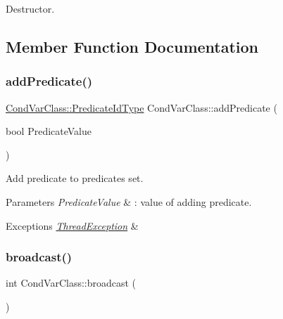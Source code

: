Destructor. 



\subsection{Member Function Documentation}
\mbox{\label{classCondVarClass_a18c457bbb27be21285f9cc52a5b8e877}} 
\subsubsection{\texorpdfstring{add\+Predicate()}{addPredicate()}}
{\footnotesize\ttfamily \hyperlink{classCondVarClass_a8e27f99972b8b95f064d6657a4583a5b}{Cond\+Var\+Class\+::\+Predicate\+Id\+Type} Cond\+Var\+Class\+::add\+Predicate (\begin{DoxyParamCaption}\item[{bool}]{Predicate\+Value }\end{DoxyParamCaption})\hspace{0.3cm}{\ttfamily [noexcept]}}

Add predicate to predicates set. 
\begin{DoxyParams}{Parameters}
{\em Predicate\+Value} & \+: value of adding predicate. \\
\hline
\end{DoxyParams}

\begin{DoxyExceptions}{Exceptions}
{\em \hyperlink{classThreadException}{Thread\+Exception}} & \\
\hline
\end{DoxyExceptions}
\mbox{\label{classCondVarClass_a31519d403ae332e86d9d93defe6031da}} 
\subsubsection{\texorpdfstring{broadcast()}{broadcast()}}
{\footnotesize\ttfamily int Cond\+Var\+Class\+::broadcast (\begin{DoxyParamCaption}{ }\end{DoxyParamCaption})\hspace{0.3cm}{\ttfamily [inline]}}

